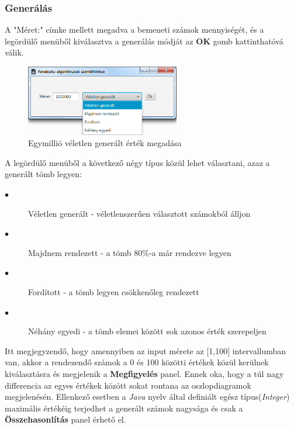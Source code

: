 \documentclass{elteikthesis}
\begin{document}
\subsubsection{Generálás}
A "Méret:" címke mellett megadva a bemeneti számok mennyiségét, és a legördülő menüből kiválasztva a generálás módját az \textbf{OK} gomb kattinthatóvá válik.
\begin{figure}[H]
	\centering
	\includegraphics[width=0.6\textwidth]{pics/randominput.png}
	\caption{Egymillió véletlen generált érték megadása}
\end{figure}
 A legördülő menüből a következő négy típus közül lehet választani, azaz a generált tömb legyen:
\begin{description}
	\item[$\bullet$] Véletlen generált - véletlenszerűen választott számokból álljon
	\item[$\bullet$] Majdnem rendezett - a tömb 80\%-a már rendezve legyen
	\item[$\bullet$] Fordított - a tömb legyen csökkenőleg rendezett
	\item[$\bullet$] Néhány egyedi - a tömb elemei között sok azonos érték szerepeljen
\end{description}
\par Itt megjegyzendő, hogy amennyiben az input mérete az [1,100] intervallumban van, akkor a rendezendő számok a 0 és 100 közötti értékek közül kerülnek kiválasztásra és megjelenik a \textbf{Megfigyelés} panel. Ennek oka, hogy a túl nagy differencia az egyes értékek között sokat rontana az oszlopdiagramok megjelenésén. Ellenkező esetben a \emph{Java} nyelv által definiált egész típus(\emph{Integer}) maximális értékéig terjedhet a generált számok nagysága és csak a \textbf{Összehasonlítás} panel érhető el.
 
\end{document}
